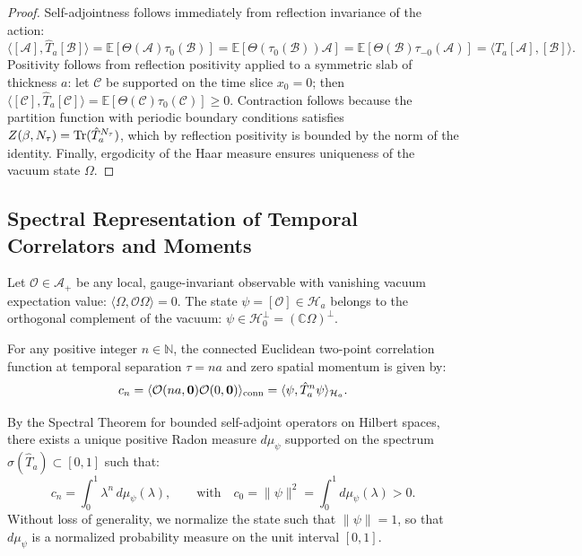 \begin{proof}
Self-adjointness follows immediately from reflection invariance of the action:
\begin{equation}
\langle [\mathcal{A}], \hat{T}_a [\mathcal{B}] \rangle = \mathbb{E}[\Theta(\mathcal{A}) \tau_0(\mathcal{B})] = \mathbb{E}[\Theta(\tau_0(\mathcal{B})) \mathcal{A}] = \mathbb{E}[\Theta(\mathcal{B}) \tau_{-0}(\mathcal{A})] = \langle \hat{T}_a [\mathcal{A}], [\mathcal{B}] \rangle.
\end{equation}
Positivity follows from reflection positivity applied to a symmetric slab of thickness $a$: let $\mathcal{C}$ be supported on the time slice $x_0 = 0$; then $\langle [\mathcal{C}], \hat{T}_a [\mathcal{C}] \rangle = \mathbb{E}[\Theta(\mathcal{C}) \tau_0(\mathcal{C})] \ge 0$. Contraction follows because the partition function with periodic boundary conditions satisfies $Z(\beta, N_\tau) = \mathrm{Tr}(\hat{T}_a^{N_\tau})$, which by reflection positivity is bounded by the norm of the identity. Finally, ergodicity of the Haar measure ensures uniqueness of the vacuum state $\Omega$.
\end{proof}

\subsection{Spectral Representation of Temporal Correlators and Moments}
\label{subsec:spectral_rep_moments}

Let $\mathcal{O} \in \mathcal{A}_+$ be any local, gauge-invariant observable with vanishing vacuum expectation value: $\langle \Omega, \mathcal{O} \Omega \rangle = 0$. The state $\psi = [\mathcal{O}] \in \mathcal{H}_a$ belongs to the orthogonal complement of the vacuum: $\psi \in \mathcal{H}_0^\perp = (\mathbb{C}\Omega)^\perp$.

For any positive integer $n \in \mathbb{N}$, the connected Euclidean two-point correlation function at temporal separation $\tau = n a$ and zero spatial momentum is given by:
\begin{equation}
\label{eq:cn_correlator_def}
c_n = \langle \mathcal{O}(n a, \mathbf{0}) \mathcal{O}(0, \mathbf{0}) \rangle_{\mathrm{conn}} = \langle \psi, \hat{T}_a^n \psi \rangle_{\mathcal{H}_a}.
\end{equation}

By the Spectral Theorem for bounded self-adjoint operators on Hilbert spaces, there exists a unique positive Radon measure $d\mu_\psi$ supported on the spectrum $\sigma(\hat{T}_a) \subset [0, 1]$ such that:
\begin{equation}
\label{eq:spectral_integral_cn}
c_n = \int_0^1 \lambda^n \, d\mu_\psi(\lambda), \qquad \text{with} \quad c_0 = \|\psi\|^2 = \int_0^1 d\mu_\psi(\lambda) > 0.
\end{equation}
Without loss of generality, we normalize the state such that $\|\psi\| = 1$, so that $d\mu_\psi$ is a normalized probability measure on the unit interval $[0, 1]$.

